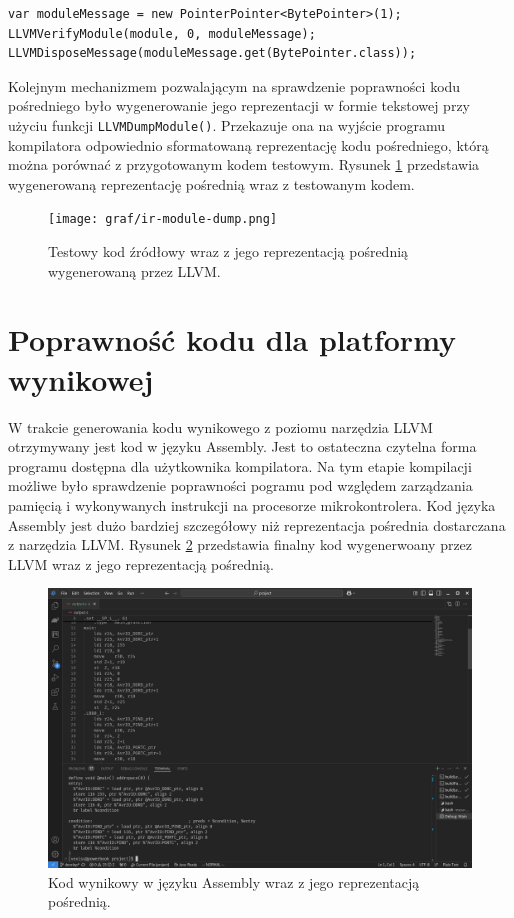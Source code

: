 \begin{lstlisting}[caption={Kod wywołujący kontrolę generowanej reprezentacji pośredniej.}, label={lst:ir-verify}]
var moduleMessage = new PointerPointer<BytePointer>(1);
LLVMVerifyModule(module, 0, moduleMessage);
LLVMDisposeMessage(moduleMessage.get(BytePointer.class)); 
\end{lstlisting}

Kolejnym mechanizmem pozwalającym na sprawdzenie poprawności kodu pośredniego było wygenerowanie jego reprezentacji w formie tekstowej przy użyciu funkcji \lstinline|LLVMDumpModule()|. Przekazuje ona na wyjście programu kompilatora odpowiednio sformatowaną reprezentację kodu pośredniego, którą można porównać z przygotowanym kodem testowym. Rysunek \ref{fig:ir-module-dump} przedstawia wygenerowaną reprezentację pośrednią wraz z testowanym kodem.

\begin{figure}
\centering
	\texttt{[image: graf/ir-module-dump.png]}
	\caption{Testowy kod źródłowy wraz z jego reprezentacją pośrednią wygenerowaną przez LLVM.}
	\label{fig:ir-module-dump}
\end{figure}

\section{Poprawność kodu dla platformy wynikowej}
W trakcie generowania kodu wynikowego z poziomu narzędzia LLVM otrzymywany jest kod w języku Assembly. Jest to ostateczna czytelna forma programu dostępna dla użytkownika kompilatora. Na tym etapie kompilacji możliwe było sprawdzenie poprawności pogramu pod względem zarządzania pamięcią i wykonywanych instrukcji na procesorze mikrokontrolera. Kod języka Assembly jest dużo bardziej szczegółowy niż reprezentacja pośrednia dostarczana z narzędzia LLVM. Rysunek \ref{fig:compiled-asm-vs-ir} przedstawia finalny kod wygenerwoany przez LLVM wraz z jego reprezentacją pośrednią. 

\begin{figure}
	\includegraphics[width=1\textwidth]{graf/compiled-asm-vs-ir.png}
	\caption{Kod wynikowy w języku Assembly wraz z jego reprezentacją pośrednią.}
	\label{fig:compiled-asm-vs-ir}
\end{figure}

